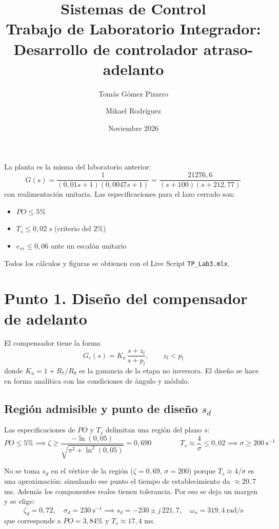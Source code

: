 \documentclass[11pt,a4paper]{article}
\title{
    \vspace{-1.2cm}
    \textbf{Sistemas de Control}\\
    \large Trabajo de Laboratorio Integrador: Desarrollo de controlador atraso-adelanto
}
\author{Tomás Gómez Pizarro \quad\and\quad Mikael Rodríguez}
\date{Noviembre 2026}
\begin{document}
\maketitle

La planta es la misma del laboratorio anterior:
\begin{equation}
    G(s) = \frac{1}{(0{,}01s + 1)(0{,}0047s + 1)} = \frac{21276{,}6}{(s + 100)(s + 212{,}77)}
\end{equation}
con realimentación unitaria. Las especificaciones para el lazo cerrado son:
\begin{itemize}
    \item $PO \le 5\%$
    \item $T_s \le 0{,}02\text{ s}$ (criterio del $2\%$)
    \item $e_{ss} \le 0{,}06$ ante un escalón unitario
\end{itemize}

Todos los cálculos y figuras se obtienen con el Live Script \texttt{TP\_Lab3.mlx}.

\section*{Punto 1. Diseño del compensador de adelanto}

El compensador tiene la forma
\begin{equation}
    G_c(s) = K_a \, \frac{s + z_l}{s + p_l}, \qquad z_l < p_l
\end{equation}
donde $K_a = 1 + R_7/R_9$ es la ganancia de la etapa no inversora. El diseño se hace en forma analítica con las condiciones de ángulo y módulo.

\subsection*{Región admisible y punto de diseño $s_d$}

Las especificaciones de $PO$ y $T_s$ delimitan una región del plano $s$:
\begin{equation}
    PO \le 5\% \implies \zeta \ge \frac{-\ln(0{,}05)}{\sqrt{\pi^2 + \ln^2(0{,}05)}} = 0{,}690
    \qquad\qquad
    T_s \approx \frac{4}{\sigma} \le 0{,}02 \implies \sigma \ge 200\ \text{s}^{-1}
\end{equation}

No se toma $s_d$ en el vértice de la región ($\zeta = 0{,}69$, $\sigma = 200$) porque $T_s \approx 4/\sigma$ es una aproximación: simulando ese punto el tiempo de establecimiento da $\approx 20{,}7$ ms. Además los componentes reales tienen tolerancia. Por eso se deja un margen y se elige:
\begin{equation}
    \zeta_d = 0{,}72,\quad \sigma_d = 230\ \text{s}^{-1}
    \implies s_d = -230 \pm j\,221{,}7, \quad \omega_n = 319{,}4\ \text{rad/s}
\end{equation}
que corresponde a $PO = 3{,}84\%$ y $T_s \approx 17{,}4$ ms.
\end{document}
